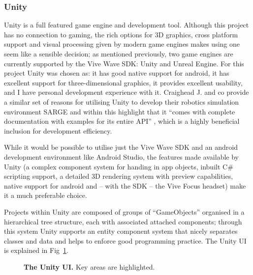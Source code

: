 \documentclass[10pt,letterpaper]{article}
\begin{document}
\subsubsection * {Unity}
Unity is a full featured game engine and development tool. Although this project has no connection to gaming, the rich options for 3D graphics, cross platform support and visual processing given by modern game engines makes using one seem like a sensible decision; as mentioned previously, two game engines are currently supported by the Vive Wave SDK: Unity and Unreal Engine. For this project Unity was chosen as: it has good native support for android, it has excellent support for three-dimensional graphics, it provides excellent usability, and I have personal development experience with it. Craighead J. and co provide a similar set of reasons for utilising Unity to develop their robotics simulation environment SARGE and within this highlight that it “comes with complete documentation with examples for its entire API” \cite{bib5}, which is a highly beneficial inclusion for development efficiency.

While it would be possible to utilise just the Vive Wave SDK and an android development environment like Android Studio, the features made available by Unity (a complex component system for handing in app objects, inbuilt C\# scripting support, a detailed 3D rendering system with preview capabilities, native support for android and – with the SDK – the Vive Focus headset) make it a much preferable choice.

Projects within Unity are composed of groups of “GameObjects” organised in a hierarchical tree structure, each with associated attached components; through this system Unity supports an entity component system that nicely separates classes and data and helps to enforce good programming practice. The Unity UI is explained in Fig~\ref{fig1}.

\begin{figure}[h!]
\caption{{\bf The Unity UI.} Key areas are highlighted.}
\label{fig1}
\end{figure}
\end{document}

